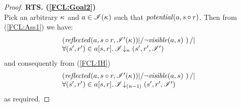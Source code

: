 \begin{lemma}[]
\begin{proof}
\noindent\textbf{RTS. (\ref{FCL:Goal2})}\\
Pick an arbitrary $\kappa_{}$ and $a \in \mathscr{I}(\kappa_{})$ such that $\mathit{potential}(a, s \circ r)$.
Then from (\ref{FCL:Ass1}) we have: 
%
\begin{align*}
	& \begin{array}{@{} l @{}}
		\left(\m{reflected}(a,s \composeL r, \lmod'(\ca{})) |/ \neg\m{visible}(a, s) \ \right) /| \\
		\for{(s', r') \in a[s, r]} \extendsAMUpto{\lmod}{n}{s'}{r'}{\lmod'}
 	\end{array}
\end{align*}
%
and consequently from (\ref{FCL:IH})
%
\begin{align*}
  &\begin{array}{@{} l @{}}
		\left(\m{reflected}(a,s \composeL r, \lmod'(\ca{})) |/ \neg\m{visible}(a, s) \ \right) /| \\
		\for{(s', r') \in a[s, r]} \extendsAMUpto{\lmod}{(n-1)}{s'}{r'}{\lmod'}
 	\end{array}
\end{align*}
%
as required.

\end{proof}
\end{lemma}
%
%
